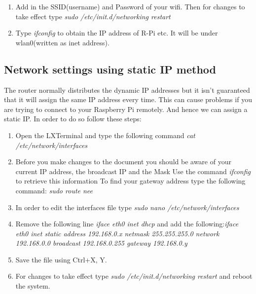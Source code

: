 \documentclass[11pt,a4paper]{report}
\begin{document}
\begin{flushleft}
\begin{enumerate}
\begin{figure}[h!]
			\centering
			\caption{}
		\end{figure}
		\item Add in the SSID(username) and Password of your wifi. Then for changes to take effect type \textit{sudo /etc/init.d/networking restart} 
		\item Type \textit{ifconfig} to obtain the IP address of R-Pi etc. It will be under wlan0(written as inet address).
	\end{enumerate}
	
	\newpage
	\subsection{Network settings using static IP method}
	The router normally distributes the dynamic IP addresses but it isn’t guaranteed that it will assign the same IP address every time. This can cause problems if you are trying to connect to your Raspberry Pi remotely. And hence we can assign a static IP. In order to do so follow these steps:
	\begin{enumerate}
		\item Open the LXTerminal and type the following command \newline \textit{cat /etc/network/interfaces}
		\item Before you make changes to the document you should be aware of your current IP address, the broadcast IP and the Mask Use the command \textit{ifconfig} to retrieve this information
		To find your gateway address type the following command: \textit{sudo route \-nee}
		\item In order to edit the interfaces file type \textit{sudo nano /etc/network/interfaces}
		\item Remove the following line \textit{iface eth0 inet dhcp} and add the following:\newline \textit{iface eth0 inet static \newline address 192.168.0.x \newline netmask 255.255.255.0 \newline network 192.168.0.0 \newline broadcast 192.168.0.255 \newline gateway 192.168.0.y }
	    \item Save the file using Ctrl+X, Y.
	    \item For changes to take effect type \textit{sudo /etc/init.d/networking restart} and reboot the system.
    \end{enumerate}
	

\end{flushleft}
\end{document}
